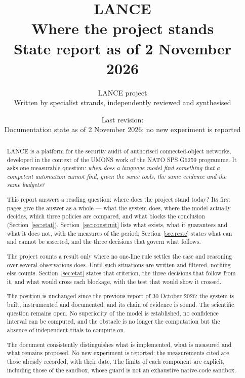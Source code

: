 \documentclass[11pt,a4paper]{article}
\title{LANCE\\[4pt]
\large Where the project stands\\[2pt]
\normalsize State report as of 2 November 2026}
\author{LANCE project\\\small Written by specialist strands, independently reviewed and synthesised}
\date{Last revision: \revision\\[3pt]
\small Documentation state as of 2 November 2026; no new experiment is reported}
\begin{document}
\maketitle

\begin{abstract}
LANCE is a platform for the security audit of authorised connected-object
networks, developed in the context of the UMONS work of the NATO SPS G6259
programme. It asks one measurable question: \emph{when does a language model find
something that a competent automation cannot find, given the same tools, the same
evidence and the same budgets?}

This report answers a reading question: where does the project stand today? Its
first pages give the answer as a whole --- what the system does, where the model
actually decides, which three policies are compared, and what blocks the
conclusion (Section~\ref{sec:etat}). Section~\ref{sec:construit} lists what
exists, what it guarantees and what it does not, with the measures of the period;
Section~\ref{sec:reste} states what can and cannot be asserted, and the three
decisions that govern what follows.

The project counts a result only where no one-line rule settles the case and
reasoning over several observations does. Until such situations are written and
filtered, nothing else counts. Section~\ref{sec:etat} states that criterion, the
three decisions that follow from it, and what would cross each blockage, with the
test that would show it crossed.

The position is unchanged since the previous report of 30 October 2026: the system
is built, instrumented and documented, and its chain of evidence is sound. The
scientific question remains open. No superiority of the model is established, no
confidence interval can be computed, and the obstacle is no longer the
computation but the absence of independent trials to compute on.

The document consistently distinguishes what is implemented, what is measured and
what remains proposed. No new experiment is reported: the measurements cited are
those already recorded, with their date. The limits of each component are
explicit, including those of the sandbox, whose guard is not an exhaustive
native-code sandbox.
\end{abstract}

\tableofcontents






\end{document}

